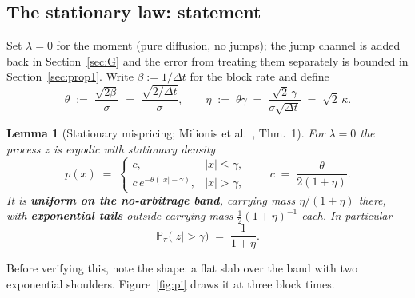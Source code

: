 \documentclass[11pt]{article}
\newtheorem{lemma}{Lemma}
\theoremstyle{definition}
\theoremstyle{remark}
\newcommand{\Prob}{\mathbb{P}}
\newcommand{\dt}{\Delta t}
\newcommand{\1}{\mathbf{1}}
\begin{document}
\subsection{The stationary law: statement}

Set $\lambda = 0$ for the moment (pure diffusion, no jumps); the jump channel is added back in Section~\ref{sec:G} and the error from treating them separately is bounded in Section~\ref{sec:prop1}. Write $\beta := 1/\dt$ for the block rate and define
\begin{equation}\label{eq:theta}
\theta \;:=\; \frac{\sqrt{2\beta}}{\sigma} \;=\; \frac{\sqrt{2/\dt}}{\sigma},
\qquad
\eta \;:=\; \theta\gamma \;=\; \frac{\sqrt2\,\gamma}{\sigma\sqrt{\dt}} \;=\; \sqrt2\,\kappa .
\end{equation}

\begin{lemma}[Stationary mispricing; Milionis et al.~\cite{milionis2023automated}, Thm.~1]\label{lem:pi}
For $\lambda = 0$ the process $z$ is ergodic with stationary density
\begin{equation}\label{eq:pi0}
p(x) \;=\;
\begin{cases}
c, & |x| \le \gamma,\\[2pt]
c\,e^{-\theta(|x|-\gamma)}, & |x| > \gamma,
\end{cases}
\qquad c \;=\; \frac{\theta}{2(1+\eta)} .
\end{equation}
It is \textbf{uniform on the no-arbitrage band}, carrying mass $\eta/(1+\eta)$ there, with \textbf{exponential tails} outside carrying mass $\tfrac12(1+\eta)^{-1}$ each. In particular
\begin{equation}\label{eq:ptrade}
\Prob_\pi\big(|z| > \gamma\big) \;=\; \frac{1}{1+\eta} .
\end{equation}
\end{lemma}

Before verifying this, note the shape: a flat slab over the band with two exponential shoulders. Figure~\ref{fig:pi} draws it at three block times.
\end{document}
